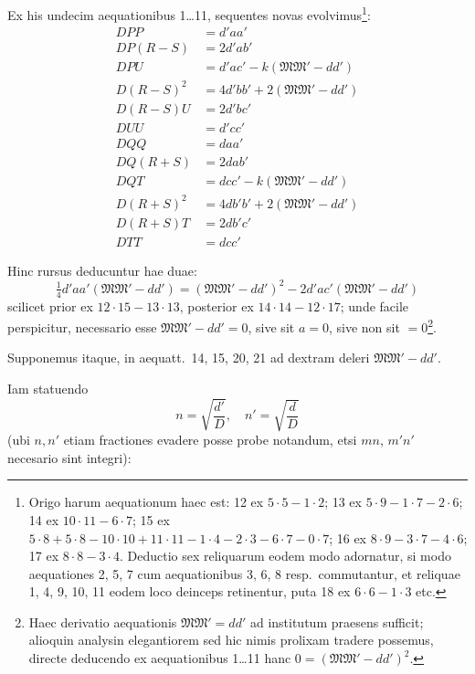 \documentclass[12pt,a4paper]{article}
\theoremstyle{plain}
\theoremstyle{definition}
\theoremstyle{remark}
\theoremstyle{problemstyle}
\begin{document}
Ex his undecim aequationibus 1\ldots 11, sequentes novas evolvimus\footnote{Origo harum aequationum haec est: 12 ex $5 \cdot 5 - 1 \cdot 2$; 13 ex $5 \cdot 9 - 1 \cdot 7 - 2 \cdot 6$; 14 ex $10 \cdot 11 - 6 \cdot 7$; 15 ex $5 \cdot 8 + 5 \cdot 8 - 10 \cdot 10 + 11 \cdot 11 - 1 \cdot 4 - 2 \cdot 3 - 6 \cdot 7 - 0 \cdot 7$; 16 ex $8 \cdot 9 - 3 \cdot 7 - 4 \cdot 6$; 17 ex $8 \cdot 8 - 3 \cdot 4$. Deductio sex reliquarum eodem modo adornatur, si modo aequationes 2, 5, 7 cum aequationibus 3, 6, 8 resp.\ commutantur, et reliquae 1, 4, 9, 10, 11 eodem loco deinceps retinentur, puta 18 ex $6 \cdot 6 - 1 \cdot 3$ etc.}:
\begin{align}
DPP &= d'aa' \tag{12} \\
DP(R-S) &= 2d'ab' \tag{13} \\
DPU &= d'ac' - k(\mathfrak{M}\mathfrak{M}' - dd') \tag{14} \\
D(R-S)^2 &= 4d'bb' + 2(\mathfrak{M}\mathfrak{M}' - dd') \tag{15} \\
D(R-S)U &= 2d'bc' \tag{16} \\
DUU &= d'cc' \tag{17} \\
DQQ &= daa' \tag{18} \\
DQ(R+S) &= 2dab' \tag{19} \\
DQT &= dcc' - k(\mathfrak{M}\mathfrak{M}' - dd') \tag{20} \\
D(R+S)^2 &= 4db'b' + 2(\mathfrak{M}\mathfrak{M}' - dd') \tag{21} \\
D(R+S)T &= 2db'c' \tag{22} \\
DTT &= dcc' \tag{23}
\end{align}

Hinc rursus deducuntur hae duae:
\[
\tfrac{1}{4}d'aa'(\mathfrak{M}\mathfrak{M}' - dd') = (\mathfrak{M}\mathfrak{M}' - dd')^2 - 2d'ac'(\mathfrak{M}\mathfrak{M}' - dd')
\]
scilicet prior ex $12 \cdot 15 - 13 \cdot 13$, posterior ex $14 \cdot 14 - 12 \cdot 17$; unde facile perspicitur, necessario esse $\mathfrak{M}\mathfrak{M}' - dd' = 0$, sive sit $a = 0$, sive non sit $=0$\footnote{Haec derivatio aequationis $\mathfrak{M}\mathfrak{M}' = dd'$ ad institutum praesens sufficit; alioquin analysin elegantiorem sed hic nimis prolixam tradere possemus, directe deducendo ex aequationibus 1\ldots 11 hanc $0 = (\mathfrak{M}\mathfrak{M}' - dd')^2$.}.

Supponemus itaque, in aequatt.\ 14, 15, 20, 21 ad dextram deleri $\mathfrak{M}\mathfrak{M}' - dd'$.

Iam statuendo
\[
n = \sqrt{\frac{d'}{D}}, \quad n' = \sqrt{\frac{d}{D}}
\]
(ubi $n, n'$ etiam fractiones evadere posse probe notandum, etsi $mn$, $m'n'$ necesario sint integri):
\end{document}
